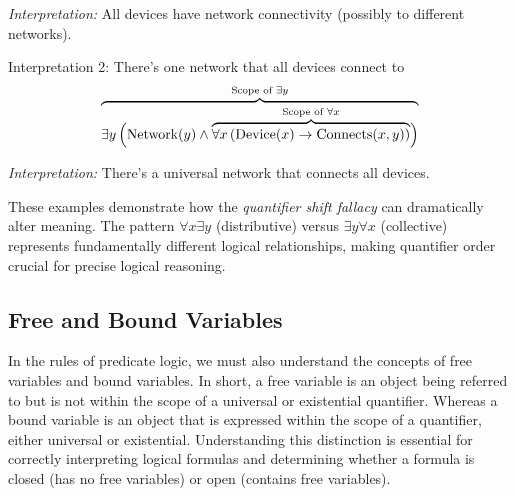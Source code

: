\documentclass[12pt,a4paper,openany]{article}
\begin{document}
\begin{enumerate}
  \emph{Interpretation:} All devices have network connectivity (possibly
  to different networks).

  Interpretation 2: There's one network that all devices connect to \[
   {\color{black}\overbrace{\color{black}\exists y \,
   \Big(
   \text{Network}(y) \wedge
   {\color{black}\overbrace{\color{black}\forall x \,
   ( \text{Device}(x) \rightarrow \text{Connects}(x,y) )
   }^{\color{black}\text{Scope of } \forall x}}
   \Big)
   }^{\color{black}\text{Scope of } \exists y}}
   \]

  \emph{Interpretation:} There's a universal network that connects all
  devices.
\end{enumerate}

These examples demonstrate how the \emph{quantifier shift fallacy} can
dramatically alter meaning. The pattern \(\forall x \exists y\)
(distributive) versus \(\exists y \forall x\) (collective) represents
fundamentally different logical relationships, making quantifier order
crucial for precise logical reasoning.

\subsection{Free and Bound
Variables}\label{free-and-bound-variables}

In the rules of predicate logic, we must also understand the concepts of
free variables and bound variables. In short, a free variable is an
object being referred to but is not within the scope of a universal or
existential quantifier. Whereas a bound variable is an object that is
expressed within the scope of a quantifier, either universal or
existential. Understanding this distinction is essential for correctly
interpreting logical formulas and determining whether a formula is
closed (has no free variables) or open (contains free variables).
\end{document}
